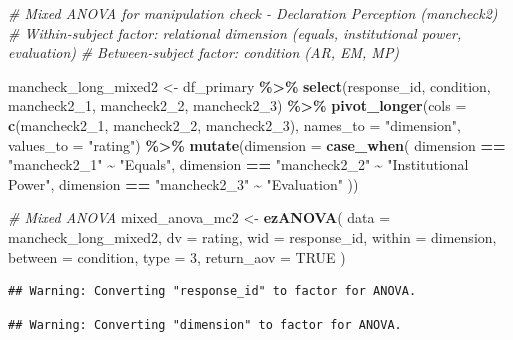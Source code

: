\documentclass[
]{article}
\newenvironment{Shaded}{\begin{snugshade}}{\end{snugshade}}
\newcommand{\AttributeTok}[1]{\textcolor[rgb]{0.13,0.29,0.53}{#1}}
\newcommand{\CommentTok}[1]{\textcolor[rgb]{0.56,0.35,0.01}{\textit{#1}}}
\newcommand{\ConstantTok}[1]{\textcolor[rgb]{0.56,0.35,0.01}{#1}}
\newcommand{\DecValTok}[1]{\textcolor[rgb]{0.00,0.00,0.81}{#1}}
\newcommand{\FunctionTok}[1]{\textcolor[rgb]{0.13,0.29,0.53}{\textbf{#1}}}
\newcommand{\NormalTok}[1]{#1}
\newcommand{\OtherTok}[1]{\textcolor[rgb]{0.56,0.35,0.01}{#1}}
\newcommand{\SpecialCharTok}[1]{\textcolor[rgb]{0.81,0.36,0.00}{\textbf{#1}}}
\newcommand{\StringTok}[1]{\textcolor[rgb]{0.31,0.60,0.02}{#1}}
\begin{document}
\begin{Shaded}
\begin{Highlighting}[]
\CommentTok{\# Mixed ANOVA for manipulation check {-} Declaration Perception (mancheck2)}
\CommentTok{\# Within{-}subject factor: relational dimension (equals, institutional power, evaluation)}
\CommentTok{\# Between{-}subject factor: condition (AR, EM, MP)}

\NormalTok{mancheck\_long\_mixed2 }\OtherTok{\textless{}{-}}\NormalTok{ df\_primary }\SpecialCharTok{\%\textgreater{}\%}
  \FunctionTok{select}\NormalTok{(response\_id, condition, mancheck2\_1, mancheck2\_2, mancheck2\_3) }\SpecialCharTok{\%\textgreater{}\%}
  \FunctionTok{pivot\_longer}\NormalTok{(}\AttributeTok{cols =} \FunctionTok{c}\NormalTok{(mancheck2\_1, mancheck2\_2, mancheck2\_3),}
               \AttributeTok{names\_to =} \StringTok{"dimension"}\NormalTok{,}
               \AttributeTok{values\_to =} \StringTok{"rating"}\NormalTok{) }\SpecialCharTok{\%\textgreater{}\%}
  \FunctionTok{mutate}\NormalTok{(}\AttributeTok{dimension =} \FunctionTok{case\_when}\NormalTok{(}
\NormalTok{    dimension }\SpecialCharTok{==} \StringTok{"mancheck2\_1"} \SpecialCharTok{\textasciitilde{}} \StringTok{"Equals"}\NormalTok{,}
\NormalTok{    dimension }\SpecialCharTok{==} \StringTok{"mancheck2\_2"} \SpecialCharTok{\textasciitilde{}} \StringTok{"Institutional Power"}\NormalTok{,}
\NormalTok{    dimension }\SpecialCharTok{==} \StringTok{"mancheck2\_3"} \SpecialCharTok{\textasciitilde{}} \StringTok{"Evaluation"}
\NormalTok{  ))}

\CommentTok{\# Mixed ANOVA}
\NormalTok{mixed\_anova\_mc2 }\OtherTok{\textless{}{-}} \FunctionTok{ezANOVA}\NormalTok{(}
  \AttributeTok{data =}\NormalTok{ mancheck\_long\_mixed2,}
  \AttributeTok{dv =}\NormalTok{ rating,}
  \AttributeTok{wid =}\NormalTok{ response\_id,}
  \AttributeTok{within =}\NormalTok{ dimension,}
  \AttributeTok{between =}\NormalTok{ condition,}
  \AttributeTok{type =} \DecValTok{3}\NormalTok{,}
  \AttributeTok{return\_aov =} \ConstantTok{TRUE}
\NormalTok{)}
\end{Highlighting}
\end{Shaded}

\begin{verbatim}
## Warning: Converting "response_id" to factor for ANOVA.
\end{verbatim}

\begin{verbatim}
## Warning: Converting "dimension" to factor for ANOVA.
\end{verbatim}
\end{document}
